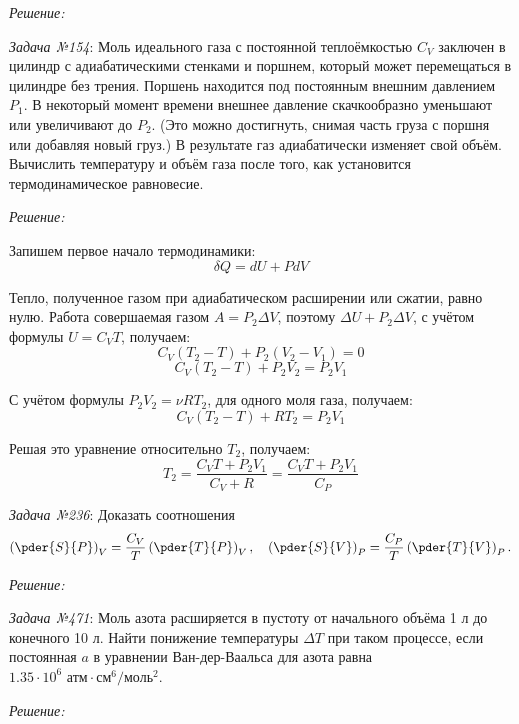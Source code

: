 \documentclass[14pt,final,titlepage]{hedsemwork}
\begin{document}
\emph{Решение:}

\newpage
\emph{Задача №154}: Моль идеального газа с постоянной теплоёмкостью 
\( C_V \) заключен в цилиндр с адиабатическими стенками и поршнем, который 
может перемещаться в цилиндре без трения. Поршень находится под постоянным 
внешним давлением \( P_1 \). В некоторый момент времени внешнее давление 
скачкообразно уменьшают или увеличивают до \( P_2 \). (Это можно 
достигнуть, снимая часть груза с поршня или добавляя новый груз.) В 
результате газ адиабатически изменяет свой объём. Вычислить температуру и 
объём газа после того, как установится термодинамическое равновесие.

\emph{Решение:}

Запишем первое начало термодинамики:
\[
	\delta Q = dU + PdV
\]

Тепло, полученное газом при адиабатическом расширении или сжатии, равно нулю. 
Работа совершаемая газом \( A = P_2 \Delta V \), поэтому 
\( \Delta U + P_2 \Delta V \), с учётом формулы \( U = C_V T \), получаем:
\[
	C_V( T_2 - T ) + P_2 ( V_2 - V_1 ) = 0
\]
\[
	C_V( T_2 - T ) + P_2 V_2 = P_2 V_1
\]

С учётом формулы \( P_2 V_2 = \nu RT_2 \), для одного моля газа, получаем:
\[
	C_V( T_2 - T ) + RT_2 = P_2 V_1
\]

Решая это уравнение относительно \( T_2 \), получаем:
\[
	T_2 = \frac{C_V T + P_2 V_1}{C_V + R} = \frac{C_V T + P_2 V_1}{C_P}
\]

\newpage
\emph{Задача №236}: Доказать соотношения
\[
    \left( \pder{S}{P} \right)_V = 
        \frac{C_V}{T} \left( \pder{T}{P} \right)_V, \quad
    \left( \pder{S}{V} \right)_P = 
        \frac{C_P}{T} \left( \pder{T}{V} \right)_P.
\]

\emph{Решение:}

\newpage
\emph{Задача №471}: Моль азота расширяется в пустоту от начального объёма 
1 л до конечного 10 л. Найти понижение температуры \( \Delta T \) при 
таком процессе, если постоянная \( a \) в уравнении Ван-дер-Ваальса для 
азота равна \( 1.35\cdot10^6 \text{ атм}\cdot\text{см}^6/\text{моль}^2 \).

\emph{Решение:}
\end{document}
